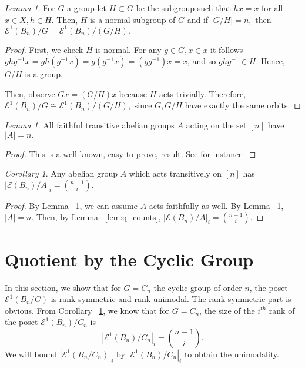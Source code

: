 \documentclass[10 pt]{amsart}
\theoremstyle{plain}
\theoremstyle{definition}
\theoremstyle{remark}
\numberwithin{equation}{section}
\newtheorem{cor}[thm]{Corollary}
\newtheorem{lem}[thm]{Lemma}
\theoremstyle{remark}
\begin{document}
\begin{lem}
\label{lem:faithful_action}
For $G$ a group let $H \subset G$ be the subgroup such that $hx = x$ for all $x \in X,h \in H.$ Then, $H$ is a normal subgroup of $G$ and if $|G/H| = n,$ then $\mathcal E^1(B_n)/G =\mathcal E^1(B_n)/(G/H).$
\end{lem}
\begin{proof}
First, we check $H$ is normal. For any $g \in G,x \in x$ it follows $ghg^{-1}x = gh(g^{-1}x) = g(g^{-1}x) = (gg^{-1})x = x$, and so $ghg^{-1} \in H.$ Hence, $G/H$ is a group.

Then, observe $Gx = (G/H)x$ because $H$ acts trivially. Therefore, $\mathcal E^1(B_n)/G \cong \mathcal E^1(B_n)/(G/H),$ since $G,G/H$ have exactly the same orbits.
\end{proof}

\begin{lem}
\label{lem:transitive_abelian}
All faithful transitive abelian groups $A$ acting on the set $[n]$ have $|A| = n.$
\end{lem}
\begin{proof}
This is a well known, easy to prove, result. See for instance \cite{stack}
\end{proof}

\begin{cor}
\label{cor:transitive_abelian_ranks}
Any abelian group $A$ which acts transitively on $[n]$ has $|\mathcal E (B_n)/A|_i= \binom{n-1}{i}.$
\end{cor}
\begin{proof}
By Lemma ~\ref{lem:faithful_action}, we can assume $A$ acts faithfully as well.
By Lemma ~\ref{lem:transitive_abelian}, $|A| = n.$ Then, by Lemma ~\ref{lem:q_counts}, $|\mathcal E (B_n)/A|_i = \binom{n-1}{i}.$
\end{proof}






\section{Quotient by the Cyclic Group}
\label{sec:cyclic}

In this section, we show that for $G = C_n$ the cyclic group of order $n$, the poset $\mathcal E^1(B_n/G)$ is rank symmetric and rank unimodal. The rank symmetric part is obvious. From Corollary ~\ref{cor:transitive_abelian_ranks}, we know that for $G = C_n$, the size of the $i^{th}$ rank of the poset $\mathcal E^1 (B_n)/C_n$ is $$|\mathcal E^1 (B_n)/C_n|_{i} = \binom{n-1}{i}.$$
We will bound $|\mathcal E^1(B_n/C_n)|_{i}$ by  $|\mathcal E^1 (B_n)/C_n|_{i}$ to obtain the unimodality. 
\end{document}

